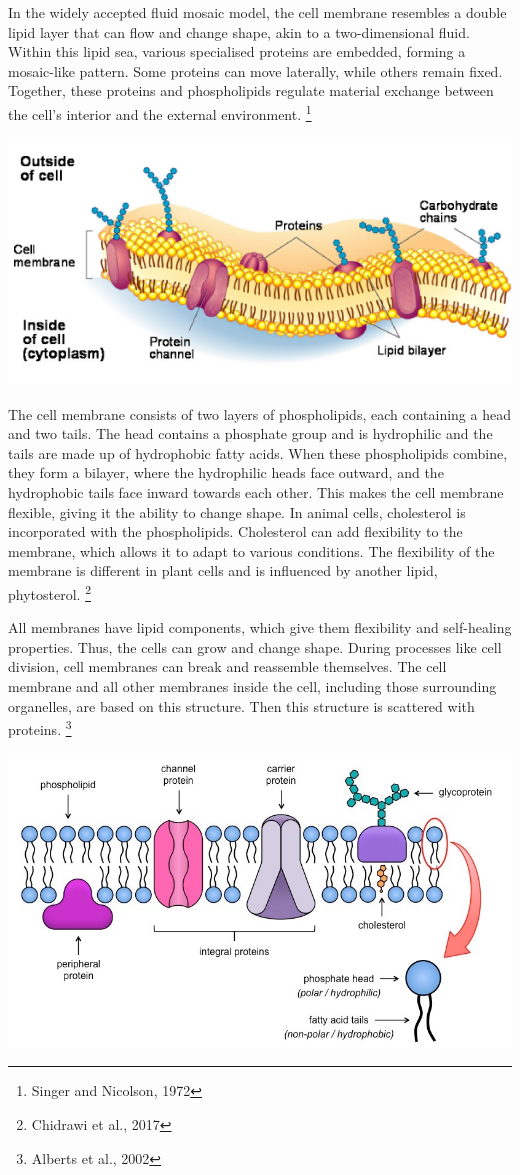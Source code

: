 \documentclass[a4paper,12pt,twoside,english]{all-in-one} %
\begin{document}
In the widely accepted fluid mosaic model, the cell membrane resembles a double lipid layer that can flow and change shape, akin to a two-dimensional fluid. Within this lipid sea, various specialised proteins are embedded, forming a mosaic-like pattern. Some proteins can move laterally, while others remain fixed. Together, these proteins and phospholipids regulate material exchange between the cell’s interior and the external environment. \footnote{Singer and Nicolson, 1972}

\includegraphics[scale=0.8]{images/1.jpg}

The cell membrane consists of two layers of phospholipids, each containing a head and two tails. The head contains a phosphate group and is hydrophilic and the tails are made up of hydrophobic fatty acids. When these phospholipids combine, they form a bilayer, where the hydrophilic heads face outward, and the hydrophobic tails face inward towards each other. This makes the cell membrane flexible, giving it the ability to change shape. In animal cells, cholesterol is incorporated with the phospholipids. Cholesterol can add flexibility to the membrane, which allows it to adapt to various conditions. The flexibility of the membrane is different in plant cells and is influenced by another lipid, phytosterol. \footnote{Chidrawi et al., 2017}

All membranes have lipid components, which give them flexibility and self-healing properties. Thus, the cells can grow and change shape. During processes like cell division, cell membranes can break and reassemble themselves. The cell membrane and all other membranes inside the cell, including those surrounding organelles, are based on this structure. Then this structure is scattered with proteins. \footnote{Alberts et al., 2002}

\includegraphics[scale=0.58]{images/2.jpeg}
\end{document}
